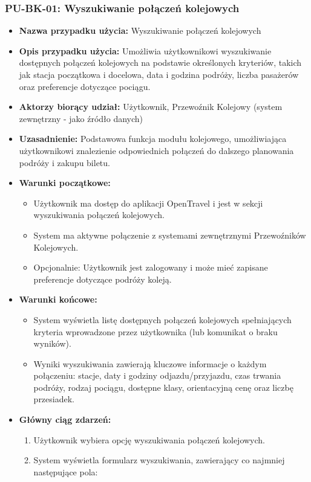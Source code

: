 \documentclass[a4paper,12pt]{article}
\begin{document}
\subsubsection{PU-BK-01: Wyszukiwanie połączeń kolejowych}
\begin{itemize}
\item \textbf{Nazwa przypadku użycia:} Wyszukiwanie połączeń kolejowych
\item \textbf{Opis przypadku użycia:} Umożliwia użytkownikowi wyszukiwanie dostępnych połączeń kolejowych na podstawie określonych kryteriów, takich jak stacja początkowa i docelowa, data i godzina podróży, liczba pasażerów oraz preferencje dotyczące pociągu.
\item \textbf{Aktorzy biorący udział:} Użytkownik, Przewoźnik Kolejowy (system zewnętrzny - jako źródło danych)
\item \textbf{Uzasadnienie:} Podstawowa funkcja modułu kolejowego, umożliwiająca użytkownikowi znalezienie odpowiednich połączeń do dalszego planowania podróży i zakupu biletu.
\item \textbf{Warunki początkowe:}
\begin{itemize}
\item Użytkownik ma dostęp do aplikacji OpenTravel i jest w sekcji wyszukiwania połączeń kolejowych.
\item System ma aktywne połączenie z systemami zewnętrznymi Przewoźników Kolejowych.
\item Opcjonalnie: Użytkownik jest zalogowany i może mieć zapisane preferencje dotyczące podróży koleją.
\end{itemize}
\item \textbf{Warunki końcowe:}
\begin{itemize}
\item System wyświetla listę dostępnych połączeń kolejowych spełniających kryteria wprowadzone przez użytkownika (lub komunikat o braku wyników).
\item Wyniki wyszukiwania zawierają kluczowe informacje o każdym połączeniu: stacje, daty i godziny odjazdu/przyjazdu, czas trwania podróży, rodzaj pociągu, dostępne klasy, orientacyjną cenę oraz liczbę przesiadek.
\end{itemize}
\item \textbf{Główny ciąg zdarzeń:}
\begin{enumerate}
\item Użytkownik wybiera opcję wyszukiwania połączeń kolejowych.
\item System wyświetla formularz wyszukiwania, zawierający co najmniej następujące pola:

\end{enumerate}
\end{itemize}
\end{document}
